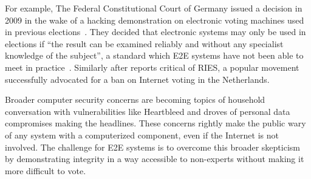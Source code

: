 For example, The Federal Constitutional Court of Germany issued a
decision in 2009 in the wake of a hacking demonstration on electronic
voting machines used in previous elections~\cite{germany2009decision}.
They decided that electronic systems may only be used in elections if
``the result can be examined reliably and without any specialist
knowledge of the subject'', a standard which E2E systems have not been
able to meet in practice~\cite{byrne2007usability}. Similarly after
reports critical of RIES, a popular movement successfully advocated
for a ban on Internet voting in the Netherlands.

Broader computer security concerns are becoming topics of household
conversation with vulnerabilities like Heartbleed and droves of
personal data compromises making the headlines. These concerns rightly
make the public wary of any system with a computerized component, even
if the Internet is not involved. The challenge for E2E systems is to
overcome this broader skepticism by demonstrating integrity in a way
accessible to non-experts without making it more difficult to vote.

